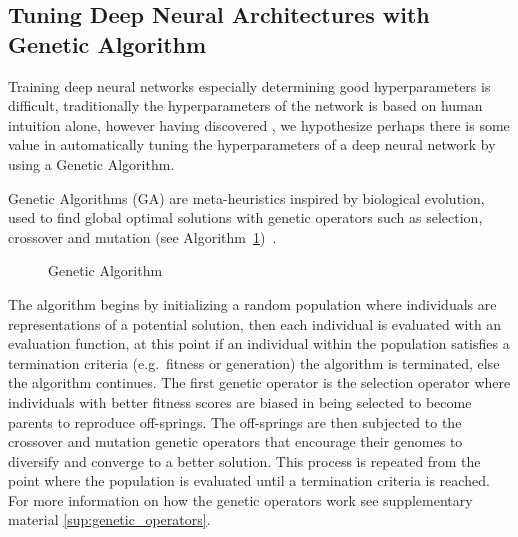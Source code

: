 \newpage
\subsection{Tuning Deep Neural Architectures with Genetic Algorithm}
\label{sec:tuning_deep_nets_with_ga}
Training deep neural networks especially determining good hyperparameters is difficult, traditionally the hyperparameters of the network is based on human intuition alone, however having discovered \cite{kitano1990empirical, leung2003tuning, montana1989training}
, we hypothesize perhaps there is some value in automatically tuning the hyperparameters of a deep neural network by using a Genetic Algorithm.

Genetic Algorithms (GA) are meta-heuristics inspired by biological evolution, used to find global optimal solutions with genetic operators such as selection, crossover and mutation (see Algorithm~\ref{al:ga})~\cite{john1992adaptation, mitchell1998introduction}. 

\begin{figure}
	\vspace{-0.8cm}
	\begin{minipage}[t]{0.48\textwidth}
		\begin{algorithm}[H]
			\caption{Genetic Algorithm}
			\label{al:ga}
			
			\begin{algorithmic}
				\STATE
				\STATE
				\STATE
				\ENDIF	
				\STATE
				\ENDWHILE
			\end{algorithmic}
		\end{algorithm}
	\end{minipage}
	\vspace{-0.4cm}
\end{figure}

The algorithm begins by initializing a random population where individuals are representations of a potential solution, then each individual is evaluated with an evaluation function, at this point if an individual within the population satisfies a termination criteria (e.g.\ fitness or generation) the algorithm is terminated, else the algorithm continues. The first genetic operator is the selection operator where individuals with better fitness scores are biased in being selected to become parents to reproduce off-springs. The off-springs are then subjected to the crossover and mutation genetic operators that encourage their genomes to diversify and converge to a better solution. This process is repeated from the point where the population is evaluated until a termination criteria is reached. For more information on how the genetic operators work see supplementary material \ref{sup:genetic_operators}.



